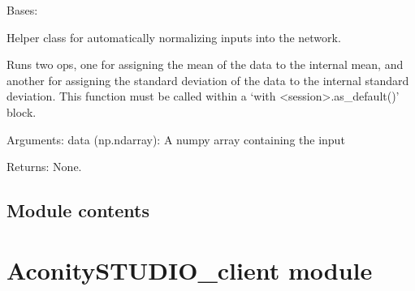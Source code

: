 \documentclass[letterpaper,10pt,english,openany,oneside]{sphinxmanual}
\begin{document}

\begin{fulllineitems}
\label{\detokenize{_modules/utils:utils.TensorStandardScaler.TensorStandardScaler1D}}
Bases: {\hyperref[\detokenize{_modules/utils:utils.TensorStandardScaler.TensorStandardScaler}]{}}

Helper class for automatically normalizing inputs into the network.

\begin{fulllineitems}
\label{\detokenize{_modules/utils:utils.TensorStandardScaler.TensorStandardScaler1D.fit}}
Runs two ops, one for assigning the mean of the data to the internal mean, and
another for assigning the standard deviation of the data to the internal standard deviation.
This function must be called within a ‘with \textless{}session\textgreater{}.as\_default()’ block.

Arguments:
data (np.ndarray): A numpy array containing the input

Returns: None.

\end{fulllineitems}


\end{fulllineitems}



\subsection{Module contents}
\label{\detokenize{_modules/utils:module-utils}}\label{\detokenize{_modules/utils:module-contents}}

\section{AconitySTUDIO\_client module}
\label{\detokenize{_modules/AconitySTUDIO_client:module-AconitySTUDIO_client}}\label{\detokenize{_modules/AconitySTUDIO_client:aconitystudio-client-module}}\label{\detokenize{_modules/AconitySTUDIO_client::doc}}
\end{document}
